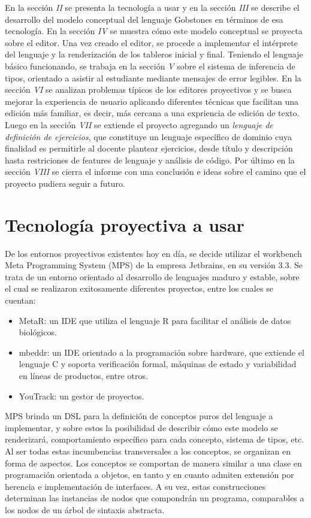 En la sección \textit{II} se presenta la tecnología a usar y en la sección \textit{III} se describe el desarrollo del modelo conceptual del lenguaje Gobstones en términos de esa tecnología. En la sección \textit{IV} se muestra cómo este modelo conceptual se proyecta sobre el editor. Una vez creado el editor, se procede a implementar el intérprete del lenguaje y la renderización de los tableros inicial y final. Teniendo el lenguaje básico funcionando, se trabaja en la sección \textit{V} sobre el sistema de inferencia de tipos, orientado a asistir al estudiante mediante mensajes de error legibles. En la sección \textit{VI} se analizan problemas típicos de los editores proyectivos y se busca mejorar la experiencia de usuario aplicando diferentes técnicas que facilitan una edición más familiar, es decir, más cercana a una expriencia de edición de texto. Luego en la sección \textit{VII} se extiende el proyecto agregando un \textit{lenguaje de definición de ejercicios}, que constituye un lenguaje específico de dominio cuya finalidad es permitirle al docente plantear ejercicios, desde título y descripción hasta restriciones de features de lenguaje y análisis de código. Por último en la sección \textit{VIII} se cierra el informe con una conclusión e ideas sobre el camino que el proyecto pudiera seguir a futuro.

\section{Tecnología proyectiva a usar}

De los entornos proyectivos existentes hoy en día, se decide utilizar el workbench Meta Programming System (MPS)\cite{MPS} de la empresa Jetbrains, en su versión 3.3.
Se trata de un entorno orientado al desarrollo de lenguajes maduro y estable, sobre el cual se realizaron exitosamente diferentes proyectos, entre los cuales se cuentan:
\begin{itemize}
\item MetaR\cite{MetaR}: un IDE que utiliza el lenguaje R para facilitar el análisis de datos biológicos.
\item mbeddr\cite{mbeddr}: un IDE orientado a la programación sobre hardware, que extiende el lenguaje C y soporta verificación formal, máquinas de estado y variabilidad en líneas de productos, entre otros.
\item YouTrack\cite{YouTrack}: un gestor de proyectos.
\end{itemize}

MPS brinda un DSL para la definición de conceptos puros del lenguaje a implementar, y sobre estos la posibilidad de describir cómo este modelo se renderizará, comportamiento específico para cada concepto, sistema de tipos, etc. Al ser todas estas incumbencias transversales a los conceptos, se organizan en forma de aspectos.
Los conceptos se comportan de manera similar a una clase en programación orientada a objetos, en tanto y en cuanto admiten extensión por herencia e implementación de interfaces. A su vez, estas construcciones determinan las instancias de nodos que compondrán un programa, comparables a los nodos de un árbol de sintaxis abstracta.

